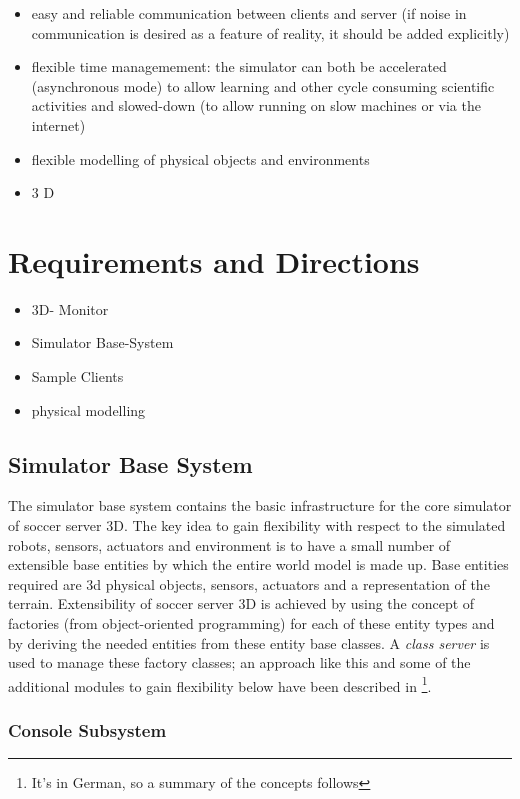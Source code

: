 \documentclass[a4paper,12pt]{article}
\begin{document}
\begin{itemize}
\item easy and reliable communication between clients and server (if
  noise in communication is desired as a feature of reality, it should
  be added explicitly)
\item flexible time managemement: the simulator can both be
  accelerated (asynchronous mode) to allow learning and other cycle
  consuming scientific activities and slowed-down (to allow running on
  slow machines or via the internet)
\item flexible modelling of physical objects and environments
\item 3 D
\end{itemize}

\section{Requirements and Directions}

\begin{itemize}
\item 3D- Monitor
\item Simulator Base-System
\item Sample Clients
\item physical modelling
\end{itemize}


\subsection{Simulator Base System}
\label{sec:sbs}

The simulator base system contains the basic infrastructure for the
core simulator of soccer server 3D. The key idea to gain flexibility
with respect to the simulated robots, sensors, actuators and
environment is to have a small number of extensible base entities by
which the entire world model is made up. Base entities required are 3d
physical objects, sensors, actuators and a representation of the
terrain. Extensibility of soccer server 3D is achieved by using the
concept of factories (from object-oriented programming) for each of
these entity types and by deriving the needed entities from these
entity base classes. A \emph{class server} is used to manage these
factory classes; an approach like this and some of the additional
modules to gain flexibility below have been described in
\cite{ABF+02}\footnote{It's in German, so a summary of the concepts
  follows}. 


\subsubsection{Console Subsystem}
\end{document}
